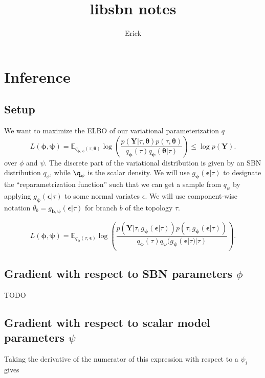 \documentclass{article}
\title{libsbn notes}
\author{Erick}
\begin{document}


\section*{Inference}

\subsection*{Setup}
We want to maximize the ELBO of our variational parameterization $q$
\[
L(\bm{\phi},{\bm{\psi}}) = \mathbb{E}_{q_{\bm{\phi},{\bm{\psi}}}(\tau, \bm{\theta})}\log\left(\frac{p(\bm{Y}|\tau, \bm{\theta}) p(\tau, \bm{\theta})}{q_{\bm{\phi}}(\tau)q_{\bm{\psi}}(\bm{\theta}|\tau)}\right) \leq \log p(\bm{Y}).
\]
over $\phi$ and $\psi$.
The discrete part of the variational distribution is given by an SBN distribution $q_\phi$, while $\q_\psi$ is the scalar density.
We will use $g_{\bm{\psi}}(\bm{\epsilon}|\tau)$ to designate the ``reparametrization function'' such that we can get a sample from $q_\psi$ by applying $g_{\bm{\psi}}(\bm{\epsilon}|\tau)$ to some normal variates $\epsilon$.
We will use component-wise notation $\theta_b = g_{\bm{b, \psi}}(\bm{\epsilon}|\tau)$ for branch $b$ of the topology $\tau$.

\[
L(\bm{\phi},{\bm{\psi}}) = \mathbb{E}_{
    q_{\bm{\phi}}(\tau,\bm{\epsilon})}
    \log\left(
        \frac
        {p(\bm{Y}|\tau,g_{\bm{\psi}}(\bm{\epsilon}|\tau))p(\tau, g_{\bm{\psi}}(\bm{\epsilon}|\tau))}
        {q_{\bm{\phi}}(\tau)q_{\bm{\psi}}(g_{\bm{\psi}}(\bm{\epsilon}|\tau)|\tau)}
    \right).
\]

\subsection*{Gradient with respect to SBN parameters $\phi$}

TODO

\subsection*{Gradient with respect to scalar model parameters $\psi$}

Taking the derivative of the numerator of this expression with respect to a $\psi_i$ gives
\end{document}
